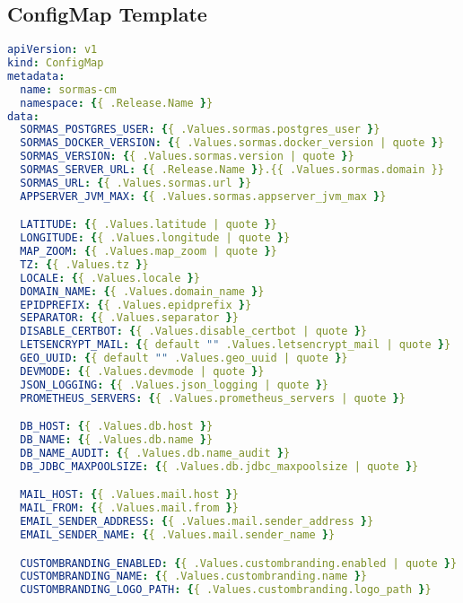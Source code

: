\subsection{ConfigMap Template}
\label{app:configmap_template}
\begin{lstlisting}[language=yaml, caption={configmap manifest}]
apiVersion: v1
kind: ConfigMap
metadata:
  name: sormas-cm
  namespace: {{ .Release.Name }}
data:
  SORMAS_POSTGRES_USER: {{ .Values.sormas.postgres_user }}
  SORMAS_DOCKER_VERSION: {{ .Values.sormas.docker_version | quote }}
  SORMAS_VERSION: {{ .Values.sormas.version | quote }}
  SORMAS_SERVER_URL: {{ .Release.Name }}.{{ .Values.sormas.domain }}
  SORMAS_URL: {{ .Values.sormas.url }}
  APPSERVER_JVM_MAX: {{ .Values.sormas.appserver_jvm_max }}

  LATITUDE: {{ .Values.latitude | quote }}
  LONGITUDE: {{ .Values.longitude | quote }}
  MAP_ZOOM: {{ .Values.map_zoom | quote }}
  TZ: {{ .Values.tz }}
  LOCALE: {{ .Values.locale }}
  DOMAIN_NAME: {{ .Values.domain_name }}
  EPIDPREFIX: {{ .Values.epidprefix }}
  SEPARATOR: {{ .Values.separator }}
  DISABLE_CERTBOT: {{ .Values.disable_certbot | quote }}
  LETSENCRYPT_MAIL: {{ default "" .Values.letsencrypt_mail | quote }}
  GEO_UUID: {{ default "" .Values.geo_uuid | quote }}
  DEVMODE: {{ .Values.devmode | quote }}
  JSON_LOGGING: {{ .Values.json_logging | quote }}
  PROMETHEUS_SERVERS: {{ .Values.prometheus_servers | quote }}

  DB_HOST: {{ .Values.db.host }}
  DB_NAME: {{ .Values.db.name }}
  DB_NAME_AUDIT: {{ .Values.db.name_audit }}
  DB_JDBC_MAXPOOLSIZE: {{ .Values.db.jdbc_maxpoolsize | quote }}

  MAIL_HOST: {{ .Values.mail.host }}
  MAIL_FROM: {{ .Values.mail.from }}
  EMAIL_SENDER_ADDRESS: {{ .Values.mail.sender_address }}
  EMAIL_SENDER_NAME: {{ .Values.mail.sender_name }}

  CUSTOMBRANDING_ENABLED: {{ .Values.custombranding.enabled | quote }}
  CUSTOMBRANDING_NAME: {{ .Values.custombranding.name }}
  CUSTOMBRANDING_LOGO_PATH: {{ .Values.custombranding.logo_path }}
\end{lstlisting}